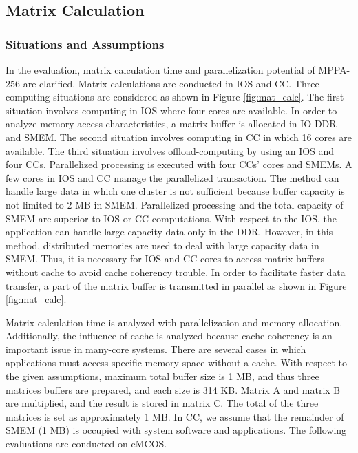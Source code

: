 \documentclass[conference,compsoc]{IEEEtran}
\begin{document}
\subsection{Matrix Calculation}
\label{sec:martix_eval}

\subsubsection{Situations and Assumptions}
\label{sec:situations_and_assumptions}
In the evaluation, matrix calculation time and parallelization potential of MPPA-256 are clarified.
Matrix calculations are conducted in IOS and CC.
Three computing situations are considered as shown in Figure \ref{fig:mat_calc}.
The first situation involves computing in IOS where four cores are available.
In order to analyze memory access characteristics, a matrix buffer is allocated in IO DDR and SMEM.
The second situation involves computing in CC in which 16 cores are available.
The third situation involves offload-computing by using an IOS and four CCs.
Parallelized processing is executed with four CCs' cores and SMEMs.
A few cores in IOS and CC manage the parallelized transaction.
The method can handle large data in which one cluster is not
sufficient because buffer capacity is not limited to 2 MB in SMEM.
Parallelized processing and the total capacity of SMEM are superior to IOS or CC computations. 
With respect to the IOS, the application can handle large capacity data only in the DDR.
However, in this method, distributed memories are used to deal with large capacity data in SMEM.
Thus, it is necessary for IOS and CC cores to access matrix buffers without cache to avoid cache coherency trouble.
In order to facilitate faster data transfer, a part of the matrix buffer is transmitted in parallel as shown in Figure \ref{fig:mat_calc}.

Matrix calculation time is analyzed with parallelization and memory allocation.
Additionally, the influence of cache is analyzed because cache coherency is an important issue in many-core systems.
There are several cases in which applications must access specific memory space without a cache.
With respect to the given assumptions, maximum total buffer size is 1 MB, and thus three matrices buffers are prepared, and each size is 314 KB.
Matrix A and matrix B are multiplied, and the result is stored in matrix C.
The total of the three matrices is set as approximately 1 MB.
In CC, we assume that the remainder of SMEM (1 MB) is occupied with system software and applications.
The following evaluations are conducted on eMCOS.
\end{document}
